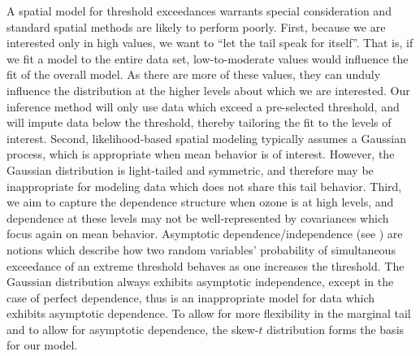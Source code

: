 \documentclass[useAMS,usenatbib,referee]{biom}
\begin{document}
A spatial model for threshold exceedances warrants special consideration and standard spatial methods are likely to perform poorly.
First, because we are interested only in high values, we want to ``let the tail speak for itself''.
That is, if we fit a model to the entire data set, low-to-moderate values would influence the fit of the overall model.
As there are more of these values, they can unduly influence the distribution at the higher levels about which we are interested.
Our inference method will only use data which exceed a pre-selected threshold, and will impute data below the threshold, thereby tailoring the fit to the levels of interest.
Second, likelihood-based spatial modeling typically assumes a Gaussian process, which is appropriate when mean behavior is of interest.
However, the Gaussian distribution is light-tailed and symmetric, and therefore may be inappropriate for modeling data which does not share this tail behavior.
Third, we aim to capture the dependence structure when ozone is at high levels, and dependence at these levels may not be well-represented by covariances which focus again on mean behavior.
Asymptotic dependence/independence (see ) are notions which describe how two random variables' probability of simultaneous exceedance of an extreme threshold behaves as one increases the threshold.
The Gaussian distribution always exhibits asymptotic independence, except in the case of perfect dependence, thus is an inappropriate model for data which exhibits asymptotic dependence.
To allow for more flexibility in the marginal tail and to allow for asymptotic dependence, the skew-$t$ distribution forms the basis for our model.
\end{document}
